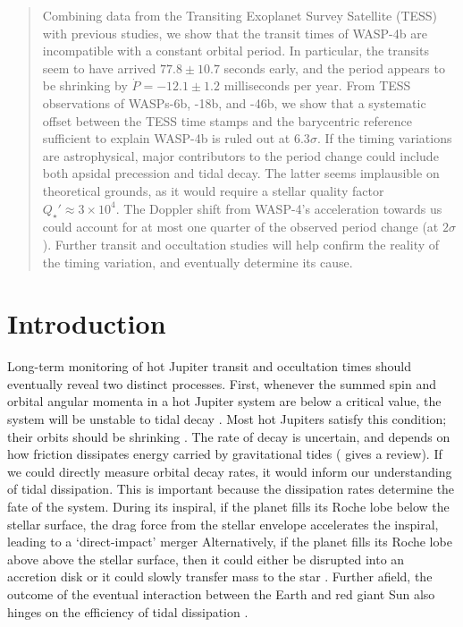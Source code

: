 \documentclass[12pt,twocolumn,tighten]{aastex62}
\begin{document}
\begin{abstract}
  Combining data from the Transiting Exoplanet Survey Satellite (TESS)
  with previous studies, we show that the transit times of WASP-4b are
  incompatible with a constant orbital period. 
  In particular, the transits seem to have arrived $77.8 \pm 10.7$
  seconds early, and the period appears to be shrinking by
  $\dot{P}=-12.1 \pm 1.2$ milliseconds per year.   
  From TESS observations of WASPs-6b, -18b, and -46b, we show
  that a systematic offset between the TESS time stamps and the barycentric
  reference sufficient to explain WASP-4b is ruled out at 6.3$\sigma$.
  If the timing variations are astrophysical,
  major contributors to the period change could include both
  apsidal precession and tidal decay.
  The latter seems implausible on theoretical grounds, as it would
  require a stellar quality factor $Q_\star' \approx 3\times10^4$.
  The Doppler shift from WASP-4's acceleration towards us could
  account for at most one quarter of the observed period change
  (at $2\sigma$).
  Further transit and occultation studies will help confirm the
  reality of the timing variation, and eventually determine its cause.
\end{abstract}


\section{Introduction}
\label{sec:intro}

Long-term monitoring of hot Jupiter transit and occultation times should
eventually reveal two distinct processes.  First, whenever the summed
spin and orbital angular momenta in a hot Jupiter system are below a
critical value, the system will be unstable to tidal decay
\citep{counselman_outcomes_1973,hut_stability_1980}.  Most hot Jupiters
satisfy this condition; their orbits should be shrinking
\citep{levrard_falling_2009,matsumura_tidal_2010}.  The rate of decay is
uncertain, and depends on how friction dissipates energy carried by
gravitational tides (\citealt{ogilvie_tidal_2014} gives a review).  If
we could directly measure orbital decay rates, it would inform our
understanding of tidal dissipation.  This is important because the
dissipation rates determine the fate of the system.  During its
inspiral, if the planet fills its Roche lobe below the stellar surface,
the drag force from the stellar envelope accelerates the inspiral,
leading to a `direct-impact' merger
\citep{metzger_optical_2012,macleod_planetary_2018} Alternatively, if
the planet fills its Roche lobe above above the stellar surface, then it
could either be disrupted into an accretion disk or it could
slowly transfer mass to the star
\citep{metzger_optical_2012,valsecchi_tidally-driven_2015,jackson_tidal_2016}.
Further afield, the outcome of the eventual interaction between the
Earth and red giant Sun also hinges on the efficiency of tidal
dissipation \citep{rasio_tidal_1996}.
\end{document}
